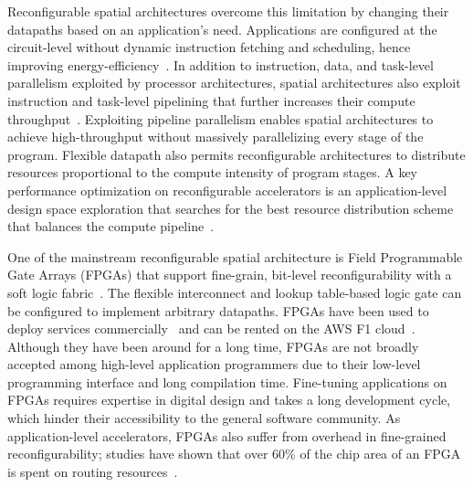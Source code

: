 Reconfigurable spatial architectures overcome this limitation by changing their datapaths based on
an application's need.
Applications are configured at the circuit-level without dynamic instruction fetching and scheduling,
hence improving energy-efficiency~\cite{calhoun,fpgaPower}.
In addition to instruction, data, and task-level parallelism exploited by processor architectures,
spatial architectures also exploit instruction and task-level pipelining that further increases
their compute throughput~\cite{spatial-computation}.
Exploiting pipeline parallelism enables spatial architectures to achieve high-throughput
without massively parallelizing every stage of the program.
Flexible datapath also permits reconfigurable architectures to distribute resources proportional to the compute intensity of
program stages.
A key performance optimization on reconfigurable accelerators is an application-level design space
exploration
that searches for the best resource distribution scheme that balances the compute pipeline~\cite{dse_koeplinger}.

One of the mainstream reconfigurable spatial architecture is
Field Programmable Gate Arrays (FPGAs) that support fine-grain,
bit-level reconfigurability with a soft logic fabric~\cite{fpga-survey}.
The flexible interconnect and lookup table-based logic gate can be configured to implement arbitrary
datapaths.
FPGAs have been used to deploy services commercially~\cite{microsoft, baidu, deephi} and can be rented on the AWS F1 cloud~\cite{aws}.
Although they have been around for a long time, FPGAs are not broadly accepted among high-level
application programmers due to their low-level programming interface and long compilation time.
Fine-tuning applications on FPGAs requires expertise in digital design and takes a long development cycle, which hinder their accessibility to the general software community.
As application-level accelerators, FPGAs also suffer from overhead in fine-grained reconfigurability;
studies have shown that over 60\% of the chip area of an FPGA is spent on routing resources~\cite{fpgaSurvey, calhoun, fpgaPower}.


